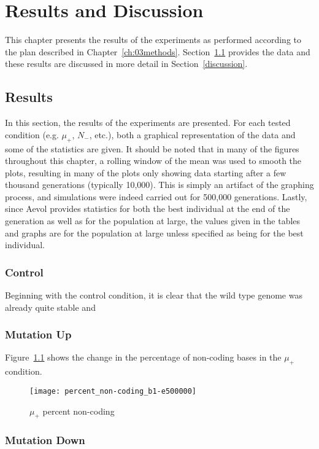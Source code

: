 \chapter{Results and Discussion}\label{ch:04results_discussion}

This chapter presents the results of the experiments as performed according to the plan described in Chapter~\ref{ch:03methods}. Section~\ref{results} provides the data and these results are discussed in more detail in Section~\ref{discussion}. 

\section{Results}\label{results}
In this section, the results of the experiments are presented. For each tested condition (e.g. $\mu_+$, $N_-$, etc.), both a graphical representation of the data and some of the statistics are given. It should be noted that in many of the figures throughout this chapter, a rolling window of the mean was used to smooth the plots, resulting in many of the plots only showing data starting after a few thousand generations (typically 10,000). This is simply an artifact of the graphing process, and simulations were indeed carried out for 500,000 generations. Lastly, since Aevol provides statistics for both the best individual at the end of the generation as well as for the population at large, the values given in the tables and graphs are for the population at large unless specified as being for the best individual. 
\subsection{Control}
Beginning with the control condition, it is clear that the wild type genome was already quite stable and 
\subsection{Mutation Up}
Figure~\ref{fig:mut_up_percent_non-coding} shows the change in the percentage of non-coding bases in the $\mu_+$ condition. 

\begin{figure}[H]
	\centering
	\texttt{[image: percent\_non-coding\_b1-e500000]}
	\caption[Mutation up - percent non-coding]{$\mu_+$ percent non-coding}
	\label{fig:mut_up_percent_non-coding}
\end{figure}
\subsection{Mutation Down}
